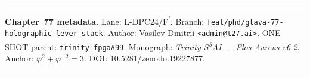 
\vspace{2em}
\noindent\rule{\textwidth}{0.4pt}

\noindent
\textbf{Chapter~77 metadata.}
Lane: L-DPC24/F\textsuperscript{$'$}.
Branch: \texttt{feat/phd/glava-77-holographic-lever-stack}.
Author: Vasilev Dmitrii \texttt{<admin@t27.ai>}.
ONE SHOT parent: \texttt{trinity-fpga\#99}.
Monograph: \emph{Trinity S\textsuperscript{3}AI — Flos Aureus v6.2}.
Anchor: $\varphi^{2}+\varphi^{-2}=3$.
DOI: 10.5281/zenodo.19227877.

\noindent\rule{\textwidth}{0.4pt}

